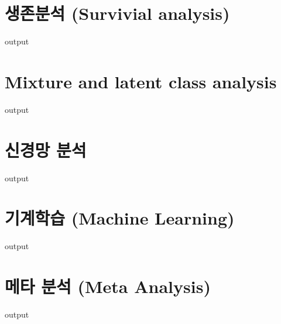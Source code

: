\documentclass{report}
\begin{document}
\section{생존분석 (Survivial analysis)}
\begin{Schunk}
\begin{Soutput}
output
\end{Soutput}
\end{Schunk}

\section{Mixture and latent class analysis}
\begin{Schunk}
\begin{Soutput}
output
\end{Soutput}
\end{Schunk}

\section{신경망 분석}
\begin{Schunk}
\begin{Soutput}
output
\end{Soutput}
\end{Schunk}

\section{기계학습 (Machine Learning)}
\begin{Schunk}
\begin{Soutput}
output
\end{Soutput}
\end{Schunk}

\section{메타 분석 (Meta Analysis)}
\begin{Schunk}
\begin{Soutput}
output
\end{Soutput}
\end{Schunk}


%
%
%
\end{document}
